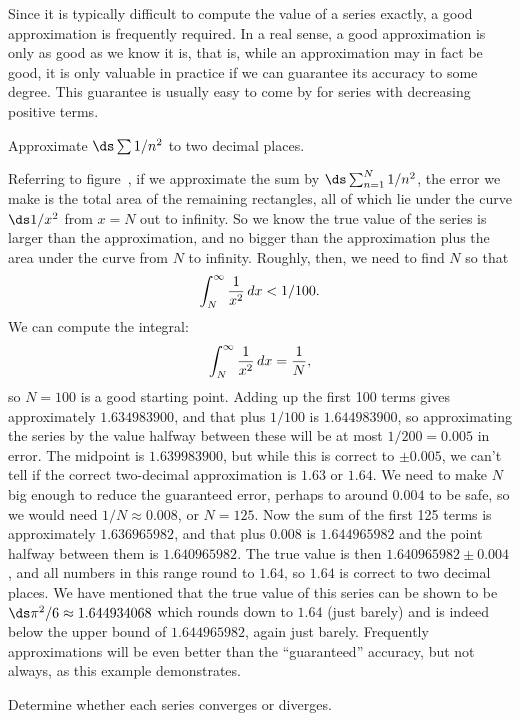 \begin{theorem}
\begin{theorem}
Since it is typically difficult to compute the value of a series
exactly, a good approximation is frequently required. In a real sense,
a good approximation is only as good as we know it is, that is, while
an approximation may in fact be good, it is only valuable in practice
if we can guarantee its accuracy to some degree. This guarantee is
usually easy to come by for series with decreasing positive terms.

\begin{example} Approximate $\ds \sum 1/n^2$ to two decimal places.

Referring to figure~,
if we approximate the sum by $\ds \sum_{n=1}^N 1/n^2$, the error we make is the
total area of the remaining rectangles, all of which lie under the
curve $\ds 1/x^2$ from $x=N$ out to infinity. So we know the true value of
the series is larger than the approximation, and no bigger than the
approximation plus the area under the curve from $N$ to
infinity. Roughly, then, we need to find $N$ so that 
$$\int_N^\infty {1\over x^2}\,dx < 1/100.$$
We can compute the integral:
$$\int_N^\infty {1\over x^2}\,dx = {1\over N},$$ 
so $N=100$ is a good starting point.  Adding up the first 100 terms
gives approximately $1.634983900$, and that plus $1/100$ is
$1.644983900$, so approximating the series by the value halfway
between these will be at most $1/200=0.005$ in error.  The midpoint is
$1.639983900$, but while this is correct to $\pm0.005$, we can't tell
if the correct two-decimal approximation is $1.63$ or $1.64$. We need
to make $N$ big enough to reduce the guaranteed error, perhaps to
around $0.004$ to be safe, so we would need $1/N\approx 0.008$, or
$N=125$. Now the sum of the first 125 terms is approximately
$1.636965982$, and that plus $0.008$ is $1.644965982$ and the point
halfway between them is $1.640965982$. The true value is then
$1.640965982\pm 0.004$, and all numbers in this range round to $1.64$,
so $1.64$ is correct to two decimal places. We have mentioned that
the true value of this series can be shown to be $\ds
\pi^2/6\approx1.644934068$ which rounds down to $1.64$ (just barely)
and is indeed below the upper bound of $1.644965982$, again just
barely. Frequently approximations will be even better than the
``guaranteed'' accuracy, but not always, as this example demonstrates.
\end{example}

\begin{exercises}

Determine whether each series converges or diverges.


\end{exercises}
\end{theorem}
\end{theorem}

